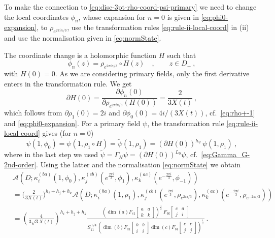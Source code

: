 \documentclass[11pt,a4paper]{article}
\numberwithin{equation}{section}
\begin{document}
\noindent 
To make the connection to \eqref{eq:disc-3pt-rho-coord-psi-primary} we need to change the local coordinates $\phi_n$, whose expansion for $n=0$ is given in \eqref{eq:phi0-expansion}, to $\rho_{e^{2\pi i n/3}}$, use the transformation rules \eqref{eq:rule-ii-local-coord} in (ii) and use the normalisation given in \eqref{eq:normState}. 

The coordinate change is a holomorphic function $H$ such that
%
\begin{equation}
    \phi_n(z) = \rho_{e^{2\pi i n/3}} \circ H(z)
    \quad , \qquad z \in D_+  \ ,
\end{equation}
%
with $H(0) = 0$. As we are considering primary fields, only the first derivative enters in the transformation rule. We get
%
\begin{equation}
    \partial H(0) = \frac{\partial \phi_n(0)}{\partial \rho_{e^{2\pi i n/3}}(H(0))} =\frac{2}{3 X(t)} \ ,
\end{equation}
%
which follows from $\partial \rho_1(0)=2i$ and $\partial \phi_0(0) = 4i / (3X(t))$, cf.\ \eqref{eq:rho+-1} and \eqref{eq:phi0-expansion}. For a primary field $\psi$, the transformation rule \eqref{eq:rule-ii-local-coord} gives (for $n=0$)
%
\begin{equation}
    \psi(1,\phi_0) = \psi(1,\rho_1 \circ H) = \tilde\psi(1,\rho_1) = 
    (\partial H(0))^{h_\psi} \, \psi(1,\rho_1) \ ,
\end{equation}
%
where in the last step we used $\tilde\psi = \Gamma_H 
\psi = (\partial H(0))^{L_0} \psi$, cf.\ \eqref{eq:Gamma_G-2nd-order}. 
Using the latter and the normalisation \eqref{eq:normState} we obtain
%
\begin{align}\label{eq:disk-amplitude-primary}
&\mathcal{A}(D;\kappa^{(ba)}_i(1,\phi_0),\kappa^{(cb)}_j(e^{\frac{2 \pi i}{3}},\phi_1),\kappa^{(ac)}_k(e^{-\frac{2 \pi i}{3}},\phi_{-1}))  
\nonumber \\
&=
\Big( \tfrac{2}{3 X(t)} \Big)^{h_i+h_j+h_k}
\mathcal{A}(D;\kappa^{(ba)}_i(1,\rho_1),\kappa^{(cb)}_j(e^{\frac{2 \pi i}{3}},\rho_{e^{2\pi i /3}}),\kappa^{(ac)}_k(e^{-\frac{2 \pi i}{3}},\rho_{e^{-2\pi i /3}}))  
\nonumber \\
&=
\left( \frac{4}{3 \sqrt{3} X(t)} \right)^{h_i+h_j+h_k}
\frac{
    \left(\dim(a) 
    F_{c1}\!\begin{bmatrix}a & a \\k & k\end{bmatrix} \right)^{\!\frac{1}{2}}
~
F_{bk}\!\begin{bmatrix}c & a \\j & i\end{bmatrix}
}{
S_{11}^{\,1/4} \,
    \left( \dim(b) 
    F_{a1}\!\begin{bmatrix}b & b \\i & i\end{bmatrix}
    \dim(c) 
    F_{b1}\!\begin{bmatrix}c & c \\j & j\end{bmatrix} \right)^{\!\frac{1}{2}}
}
\ .
\end{align}
\end{document}
